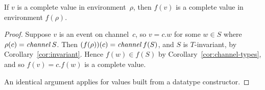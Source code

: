 \begin{lemma}
\label{lem:complete}
If $v$ is a complete value in environment~$\rho$, then $f(v)$ is a complete
value in environment $f(\rho)$.
\end{lemma}

\begin{proof}
Suppose $v$ is an event on channel~$c$, so $v = c.w$ for some $w \in S$ where
$\rho(c) = \mathop{\it channel} S$.  Then $(f(\rho))(c) = \mathop{\it channel} f(S)$, and $S$ is
$T$-invariant, by Corollary~\ref{cor:invariant}.  Hence $f(w) \in f(S)$ by
Corollary~\ref{cor:channel-types}, and so $f(v) = c.f(w)$ is a complete
value.  

An identical argument applies for values built from a datatype constructor. 
\end{proof}
